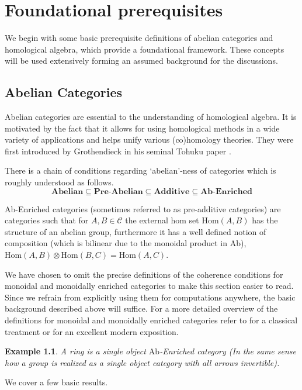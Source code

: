 \documentclass[12pt]{report}
\numberwithin{equation}{section}
\newcommand{\Hom}{{\mathrm{Hom}}}
\newtheorem{example}[dummy]{Example}
\begin{document}
	\chapter{Foundational prerequisites}
	
	
	We begin with some basic prerequisite definitions of abelian categories and homological algebra, which provide a foundational framework. These concepts will be used extensively forming an assumed background for the discussions.
%	
%	
	\section{Abelian Categories}
	Abelian categories are essential to the understanding of homological algebra. It is motivated by the fact that it allows for using homological methods in a wide variety of applications and helps unify various (co)homology theories. They were first introduced by Grothendieck in his seminal Tohuku paper \cite{grothendieck1957quelques}.
	
	There is a chain of conditions regarding `abelian'-ness of categories which is roughly understood as follows.
	\[ \textbf{Abelian} \subseteq \textbf{Pre-Abelian} \subseteq \textbf{Additive} \subseteq \textbf{Ab-Enriched}\]
	
	Ab-Enriched categories (sometimes referred to as pre-additive categories) are categories such that for $A,B \in \mathcal{C}$ the external hom set $\Hom(A,B)$ has the structure of an abelian group, furthermore it has a well defined notion of composition (which is bilinear due to the monoidal product in Ab), $\Hom(A,B)\otimes \Hom(B,C) =\Hom(A,C)$. 
	
	We have chosen to omit the precise definitions of the coherence conditions for monoidal and monoidally enriched categories to make this section easier to read. Since we refrain from explicitly using them for computations anywhere, the basic background described above will suffice. For a more detailed overview of the definitions for monoidal and monoidally enriched categories refer to \cite{lane1998categories} for a classical treatment or \cite{riehl2017category} for an excellent modern exposition. 
	\begin{example}
		A ring is a single object $\mathrm{Ab}$-Enriched category (In the same sense how a group is realized as a single object category with all arrows invertible).
	\end{example}
	We cover a few basic results.
	
\end{document}
